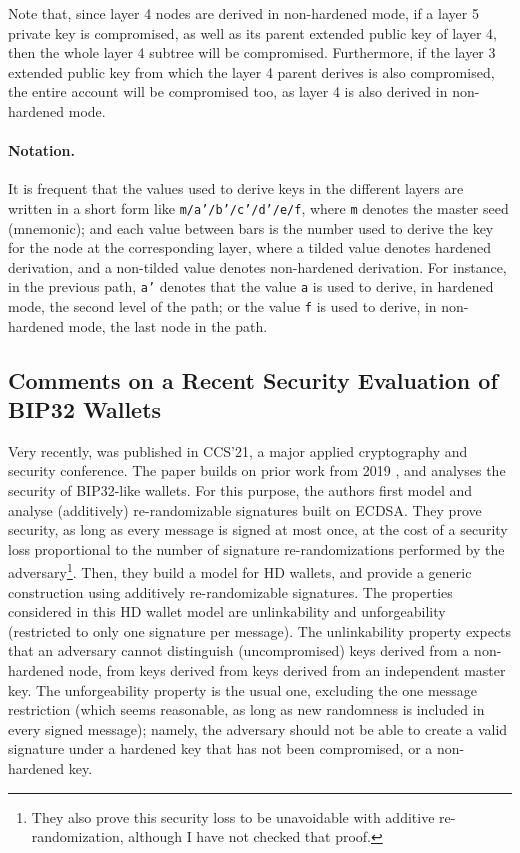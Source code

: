 Note that, since layer 4 nodes are derived in non-hardened mode, if a layer 5
private key is compromised, as well as its parent extended public key of layer
4, then the whole layer 4 subtree will be compromised. Furthermore, if the
layer 3 extended public key from which the layer 4 parent derives is also
compromised, the entire account will be compromised too, as layer 4 is also
derived in non-hardened mode.

\paragraph{Notation.} It is frequent that the values used to derive keys in
the different layers are written in a short form like \texttt{m/a'/b'/c'/d'/e/f},
where \texttt{m} denotes the master seed (mnemonic); and each value between
bars is the number used to derive the key for the node at the corresponding
layer, where a tilded value denotes hardened derivation, and a non-tilded value
denotes non-hardened derivation. For instance, in the previous path, \texttt{a'}
denotes that the value \texttt{a} is used to derive, in hardened mode, the second
level of the path; or the value \texttt{f}  is used to derive, in non-hardened
mode, the last node in the path.

\subsection{Comments on a Recent Security Evaluation of BIP32 Wallets}

Very recently, \cite{def+21} was published in CCS'21, a major applied
cryptography and security conference. The paper builds on prior work from
2019 \cite{dfl19}, and analyses the security of BIP32-like wallets. For this purpose,
the authors first model and analyse (additively) re-randomizable signatures
built on ECDSA. They prove security, as long as every message is signed at
most once, at the cost of a security loss proportional to the number of
signature re-randomizations performed by the adversary\footnote{They also prove
  this security loss to be unavoidable with additive re-randomization, although
  I have not checked that proof.}. Then, they build a model for HD wallets,
and provide a generic construction using additively re-randomizable signatures.
The properties considered in this HD wallet model are unlinkability and
unforgeability (restricted to only one signature per message). The unlinkability
property expects that an adversary cannot distinguish (uncompromised) keys
derived from a non-hardened node, from keys derived from keys derived from an
independent master key. The unforgeability property is the usual one, excluding
the one message restriction (which seems reasonable, as long as new randomness
is included in every signed message); namely, the adversary should not be able
to create a valid signature under a hardened key that has not been compromised,
or a non-hardened key.

